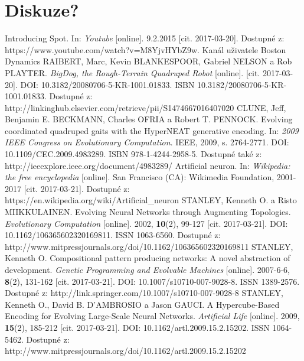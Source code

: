 \documentclass[a4]{article}
\begin{document}
\section{Diskuze?}
\begin{thebibliography}{7}
Introducing Spot. In: \textit{Youtube} [online]. 9.2.2015 [cit. 2017-03-20]. Dostupné z: https://www.youtube.com/watch?v=M8YjvHYbZ9w. Kanál uživatele Boston Dynamics
RAIBERT, Marc, Kevin BLANKESPOOR, Gabriel NELSON a Rob PLAYTER. \textit{BigDog, the Rough-Terrain Quadruped Robot} [online]. [cit. 2017-03-20]. DOI: 10.3182/20080706-5-KR-1001.01833. ISBN 10.3182/20080706-5-KR-1001.01833. Dostupné z: http://linkinghub.elsevier.com/retrieve/pii/S1474667016407020
CLUNE, Jeff, Benjamin E. BECKMANN, Charles OFRIA a Robert T. PENNOCK. Evolving coordinated quadruped gaits with the HyperNEAT generative encoding. In: \textit{2009 IEEE Congress on Evolutionary Computation}. IEEE, 2009, s. 2764-2771. DOI: 10.1109/CEC.2009.4983289. ISBN 978-1-4244-2958-5. Dostupné také z: http://ieeexplore.ieee.org/document/4983289/
Artificial neuron. In: \textit{Wikipedia: the free encyclopedia} [online]. San Francisco (CA): Wikimedia Foundation, 2001-2017 [cit. 2017-03-21]. Dostupné z: https://en.wikipedia.org/wiki/Artificial\_neuron
STANLEY, Kenneth O. a Risto MIIKKULAINEN. Evolving Neural Networks through Augmenting Topologies. \emph{Evolutionary Computation} [online]. 2002, \textbf{10}(2), 99-127 [cit. 2017-03-21]. DOI: 10.1162/106365602320169811. ISSN 1063-6560. Dostupné z: http://www.mitpressjournals.org/doi/10.1162/106365602320169811
STANLEY, Kenneth O. Compositional pattern producing networks: A novel abstraction of development. \emph{Genetic Programming and Evolvable Machines} [online]. 2007-6-6, \textbf{8}(2), 131-162 [cit. 2017-03-21]. DOI: 10.1007/s10710-007-9028-8. ISSN 1389-2576. Dostupné z: http://link.springer.com/10.1007/s10710-007-9028-8
STANLEY, Kenneth O., David B. D'AMBROSIO a Jason GAUCI. A Hypercube-Based Encoding for Evolving Large-Scale Neural Networks. \textit{Artificial Life} [online]. 2009, \textbf{15}(2), 185-212 [cit. 2017-03-21]. DOI: 10.1162/artl.2009.15.2.15202. ISSN 1064-5462. Dostupné z: http://www.mitpressjournals.org/doi/10.1162/artl.2009.15.2.15202
\end{thebibliography}
\end{document}
